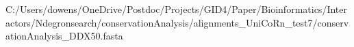 \documentclass[preview]{standalone}
\begin{document}
\begin{texshade}{C:/Users/dowens/OneDrive/Postdoc/Projects/GID4/Paper/Bioinformatics/Interactors/Ndegronsearch/conservationAnalysis/alignments_UniCoRn_test7/conservationAnalysis_DDX50.fasta}
\showlegend
\movelegend{0cm}{0cm}
\namesfootnotesize
\residuesfootnotesize
\legendfootnotesize
\numberingtiny
\end{texshade}
\end{document}

